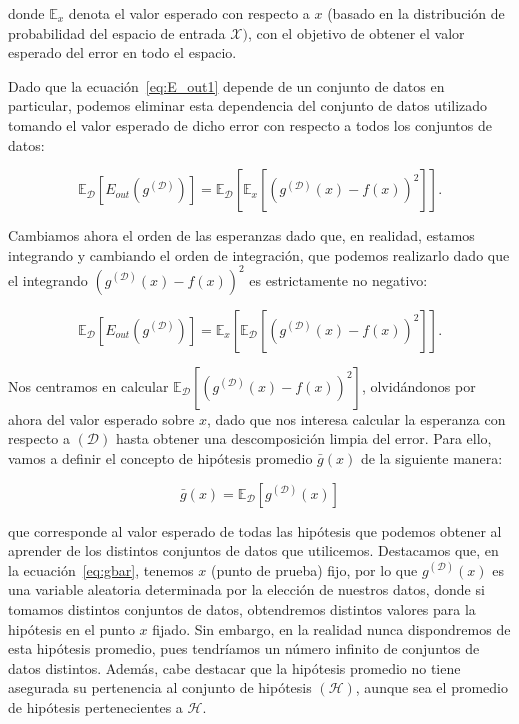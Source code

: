 donde $\mathbb{E}_{x}$ denota el valor esperado con respecto a $x$ (basado en la distribución de probabilidad del espacio de entrada $\mathcal{X})$, con el objetivo de obtener el valor esperado del error en todo el espacio.\newline

Dado que la ecuación~\eqref{eq:E_out1} depende de un conjunto de datos en particular, podemos eliminar esta dependencia del conjunto de datos utilizado tomando el valor esperado de dicho error con respecto a todos los conjuntos de datos:

\begin{equation}\label{eq:E_out2}
    \mathbb{E}_{\mathcal{D}}[E_{out}(g^{\mathcal{(D)}})] = \mathbb{E}_{\mathcal{D}}[\mathbb{E}_{x}[{(g^{\mathcal{(D)}}(x) - f(x))}^2]]. 
\end{equation}\newline

Cambiamos ahora el orden de las esperanzas dado que, en realidad, estamos integrando y cambiando el orden de integración, que podemos realizarlo dado que el integrando ${(g^{\mathcal{(D)}}(x) - f(x))}^2$ es estrictamente no negativo:

\begin{equation}\label{eq:E_out3}
    \mathbb{E}_{\mathcal{D}}[E_{out}(g^{\mathcal{(D)}})] = \mathbb{E}_{x}[\mathbb{E}_{\mathcal{D}}[{(g^{\mathcal{(D)}}(x) - f(x))}^2]].
\end{equation}\newline

Nos centramos en calcular $\mathbb{E}_{\mathcal{D}}[{(g^{\mathcal{(D)}}(x) - f(x))}^2]$, olvidándonos por ahora del valor esperado sobre $x$, dado que nos interesa calcular la esperanza con respecto a $\mathcal{(D)}$ hasta obtener una descomposición limpia del error. Para ello, vamos a definir el concepto de hipótesis promedio $\bar{g}(x)$ de la siguiente manera:

\begin{equation}\label{eq:gbar}
    \bar{g}(x) = \mathbb{E}_{\mathcal{D}}[g^{\mathcal{(D)}}(x)]
\end{equation}

que corresponde al valor esperado de todas las hipótesis que podemos obtener al aprender de los distintos conjuntos de datos que utilicemos. Destacamos que, en la ecuación~\eqref{eq:gbar}, tenemos $x$ (punto de prueba) fijo, por lo que $g^{\mathcal{(D)}}(x)$ es una variable aleatoria determinada por la elección de nuestros datos, donde si tomamos distintos conjuntos de datos, obtendremos distintos valores para la hipótesis en el punto $x$ fijado. Sin embargo, en la realidad nunca dispondremos de esta hipótesis promedio, pues tendríamos un número infinito de conjuntos de datos distintos. Además, cabe destacar que la hipótesis promedio no tiene asegurada su pertenencia al conjunto de hipótesis $\mathcal{(H)}$, aunque sea el promedio de hipótesis pertenecientes a $\mathcal{H}$.\newline

